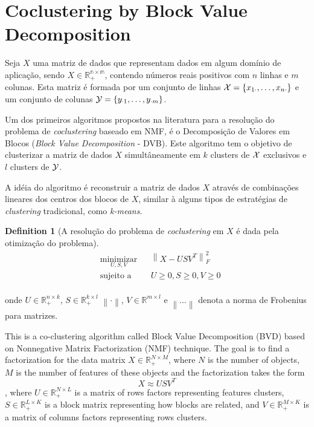 \documentclass[paper=a4, fontsize=11pt]{scrartcl} %
\numberwithin{equation}{section} %
\numberwithin{figure}{section} %
\numberwithin{table}{section} %
\newtheorem{definition}{Definition}
\newcommand{\norm}[1]{\left\lVert#1\right\rVert}
\begin{document}

\section{Coclustering by Block Value Decomposition}

Seja $X$ uma matriz de dados que representam dados em algum domínio de aplicação, sendo $X \in \mathbb{R^{n \times m}_{+}}$, contendo números reais positivos com $n$ linhas e $m$ colunas. Esta matriz é formada por um conjunto de linhas ${\cal X} = \{ x_{1 \cdot}, \dots, x_{n \cdot} \}$ e um conjunto de colunas ${\cal Y} = \{ y_{\cdot 1}, \dots, y_{\cdot m} \}$.

Um dos primeiros algoritmos propostos na literatura para a resolução do problema de \textit{coclustering} baseado em NMF, é o Decomposição de Valores em Blocos (\textit{Block Value Decomposition} - DVB). Este algoritmo tem o objetivo de clusterizar a matriz de dados $X$ simultâneamente em $k$ clusters de ${\cal X}$ exclusivos e $l$ clusters de ${\cal Y}$.

A idéia do algoritmo é reconstruir a matriz de dados $X$ através de combinações lineares dos centros dos blocos de $X$, similar à alguns tipos de estratégias de \textit{clustering} tradicional, como \textit{k-means}.

\begin{definition}[A resolução do problema de \textit{coclustering} em $X$ é dada pela otimização do problema]
	\begin{equation*}
		\begin{aligned}
		& \underset{U, S, V}{\text{minimizar}}
		& & \norm{X - USV^T}^{2}_{F} \\
		& \text{sujeito a}
		& & U \geq 0, S \geq 0, V \geq 0 \\
		\end{aligned}
	\end{equation*}
\end{definition}

onde $U \in \mathbb{R}^{n \times k}_{+}$, $S \in \mathbb{R}^{k \times l}_{+}$ $\norm{\cdot}$, $V \in \mathbb{R}^{m \times l}$ e $\norm{\dots}$ denota a norma de Frobenius para matrizes.

This is a co-clustering algorithm called Block Value Decomposition (BVD) based on Nonnegative Matrix Factorization (NMF) technique. The goal is to find a factorization for the data matrix $X \in \mathbb{R}_{+}^{N \times M}$, where $N$ is the number of objects, $M$ is the number of features of these objects and the factorization takes the form $$X \approx USV^T$$, where $U \in \mathbb{R}_{+}^{N \times L}$ is a matrix of rows factors representing features clusters, $S \in \mathbb{R}_{+}^{L \times K}$ is a block matrix representing how blocks are related, and $V \in \mathbb{R}_{+}^{M \times K}$ is a matrix of columns factors representing rows clusters.
\end{document}

